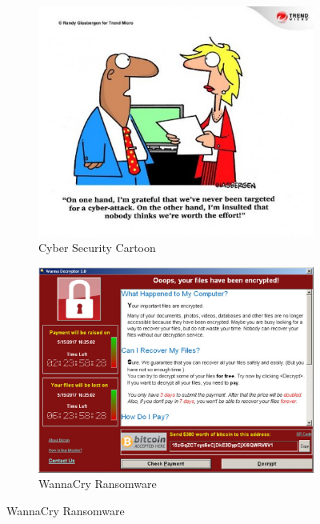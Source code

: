 \documentclass{article}
\begin{document}
\begin{figure}[htp]
\begin{subfigure}{0.5\textwidth}
\includegraphics[width=1\textwidth]{Figures/Cartoon}
\caption{Cyber Security Cartoon\cite{cartoon}}
\label{Cartoon}
\end{subfigure}
\begin{subfigure}{0.5\textwidth}
\includegraphics[width=1\textwidth]{Figures/wannacry}
\caption{WannaCry Ransomware}
\label{wannacry_decryptor}
\end{subfigure}
\end{figure}
\end{document}
